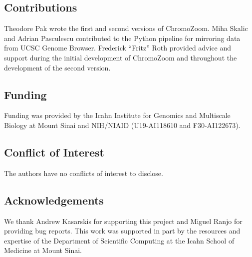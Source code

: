 \subsection{Contributions}

Theodore Pak wrote the first and second versions of ChromoZoom. Miha Skalic and Adrian Pasculescu contributed to the Python pipeline for mirroring data from UCSC Genome Browser. Frederick ``Fritz'' Roth provided advice and support during the initial development of ChromoZoom and throughout the development of the second version.

\subsection{Funding}

Funding was provided by the Icahn Institute for Genomics and Multiscale Biology at Mount Sinai and NIH/NIAID (U19-AI118610 and F30-AI122673).

\subsection{Conflict of Interest}

The authors have no conflicts of interest to disclose.

\subsection{Acknowledgements}

We thank Andrew Kasarskis for supporting this project and Miguel Ranjo for providing bug reports. This work was supported in part by the resources and expertise of the Department of Scientific Computing at the Icahn School of Medicine at Mount Sinai.

